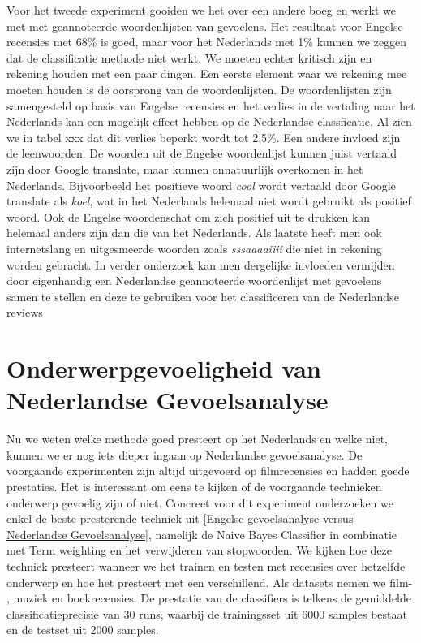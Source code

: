 Voor het tweede experiment gooiden we het over een andere boeg en werkt we met met geannoteerde woordenlijsten van gevoelens. Het resultaat voor Engelse recensies met 68\% is goed, maar voor het Nederlands met 1\% kunnen we zeggen dat de classificatie methode niet werkt. We moeten echter kritisch zijn en rekening houden met een paar dingen. Een eerste element waar we rekening mee moeten houden is de oorsprong van de woordenlijsten. De woordenlijsten zijn samengesteld op basis van Engelse recensies en  het verlies in de vertaling naar het Nederlands kan een mogelijk effect hebben op de Nederlandse classficatie. Al zien we in tabel xxx dat dit verlies beperkt wordt tot 2,5\%. Een andere invloed zijn de leenwoorden. De woorden uit de Engelse woordenlijst kunnen juist vertaald zijn door Google translate, maar kunnen onnatuurlijk overkomen in het Nederlands. Bijvoorbeeld het positieve woord \textit{cool} wordt vertaald door Google translate als \textit{koel}, wat in het Nederlands helemaal niet wordt gebruikt als positief woord. Ook de Engelse woordenschat om zich positief uit te drukken kan helemaal anders zijn dan die van het Nederlands. Als laatste heeft men ook internetslang en uitgesmeerde woorden zoals \textit{sssaaaaiiii} die niet in rekening worden gebracht. In verder onderzoek kan men dergelijke invloeden vermijden door eigenhandig een Nederlandse geannoteerde woordenlijst met gevoelens samen te stellen en deze te gebruiken voor het classificeren van de Nederlandse reviews














\section{Onderwerpgevoeligheid van Nederlandse Gevoelsanalyse}\label{Onderwerpgevoeligheid van Nederlandse Gevoelsanalyse}

Nu we weten welke methode goed presteert op het Nederlands en welke niet, kunnen we er nog iets dieper ingaan op Nederlandse gevoelsanalyse. De voorgaande experimenten zijn altijd uitgevoerd op filmrecensies en hadden goede prestaties. Het is interessant om eens te kijken of de voorgaande technieken onderwerp gevoelig zijn of niet. Concreet voor dit experiment onderzoeken we enkel de beste presterende techniek uit \ref{Engelse gevoelsanalyse versus Nederlandse Gevoelsanalyse}, namelijk de Naive Bayes Classifier in combinatie met Term weighting en het verwijderen van stopwoorden. We kijken hoe deze techniek presteert wanneer we het trainen en testen met recensies over hetzelfde onderwerp en hoe het presteert met een verschillend.  Als datasets nemen we film- , muziek en boekrecensies. De prestatie van de classifiers is telkens de gemiddelde classificatieprecisie van 30 runs, waarbij de trainingsset uit 6000 samples bestaat en de testset uit 2000 samples. 

